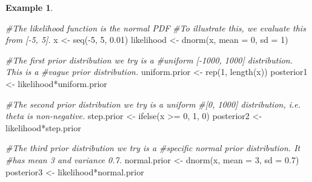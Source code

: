 \documentclass[
]{book}
\newenvironment{Shaded}{\begin{snugshade}}{\end{snugshade}}
\newcommand{\AttributeTok}[1]{\textcolor[rgb]{0.77,0.63,0.00}{#1}}
\newcommand{\CommentTok}[1]{\textcolor[rgb]{0.56,0.35,0.01}{\textit{#1}}}
\newcommand{\DecValTok}[1]{\textcolor[rgb]{0.00,0.00,0.81}{#1}}
\newcommand{\FloatTok}[1]{\textcolor[rgb]{0.00,0.00,0.81}{#1}}
\newcommand{\FunctionTok}[1]{\textcolor[rgb]{0.00,0.00,0.00}{#1}}
\newcommand{\NormalTok}[1]{#1}
\newcommand{\OtherTok}[1]{\textcolor[rgb]{0.56,0.35,0.01}{#1}}
\newcommand{\SpecialCharTok}[1]{\textcolor[rgb]{0.00,0.00,0.00}{#1}}
\theoremstyle{definition}
\theoremstyle{definition}
\newtheorem{example}{Example}[chapter]
\theoremstyle{definition}
\theoremstyle{definition}
\theoremstyle{remark}
\begin{document}
\begin{example}
\begin{Shaded}
\begin{Highlighting}[]
\CommentTok{\#The likelihood function is the normal PDF}
\CommentTok{\#To illustrate this, we evaluate this from [{-}5, 5].}
\NormalTok{x }\OtherTok{\textless{}{-}} \FunctionTok{seq}\NormalTok{(}\SpecialCharTok{{-}}\DecValTok{5}\NormalTok{, }\DecValTok{5}\NormalTok{, }\FloatTok{0.01}\NormalTok{)}
\NormalTok{likelihood }\OtherTok{\textless{}{-}} \FunctionTok{dnorm}\NormalTok{(x, }\AttributeTok{mean =} \DecValTok{0}\NormalTok{, }\AttributeTok{sd =} \DecValTok{1}\NormalTok{)}

\CommentTok{\#The first prior distribution we try is a }
\CommentTok{\#uniform [{-}1000, 1000] distribution. This is a }
\CommentTok{\#vague prior distribution. }
\NormalTok{uniform.prior }\OtherTok{\textless{}{-}} \FunctionTok{rep}\NormalTok{(}\DecValTok{1}\NormalTok{, }\FunctionTok{length}\NormalTok{(x))}
\NormalTok{posterior1 }\OtherTok{\textless{}{-}}\NormalTok{ likelihood}\SpecialCharTok{*}\NormalTok{uniform.prior}


\CommentTok{\#The second prior distribution we try is a uniform }
\CommentTok{\#[0, 1000] distribution, i.e. theta is non{-}negative. }
\NormalTok{step.prior }\OtherTok{\textless{}{-}} \FunctionTok{ifelse}\NormalTok{(x }\SpecialCharTok{\textgreater{}=} \DecValTok{0}\NormalTok{, }\DecValTok{1}\NormalTok{, }\DecValTok{0}\NormalTok{)}
\NormalTok{posterior2 }\OtherTok{\textless{}{-}}\NormalTok{ likelihood}\SpecialCharTok{*}\NormalTok{step.prior}


\CommentTok{\#The third prior distribution we try is a}
\CommentTok{\#specific normal prior distribution. It}
\CommentTok{\#has mean 3 and variance 0.7.}
\NormalTok{normal.prior }\OtherTok{\textless{}{-}} \FunctionTok{dnorm}\NormalTok{(x, }\AttributeTok{mean =} \DecValTok{3}\NormalTok{, }\AttributeTok{sd =} \FloatTok{0.7}\NormalTok{)}
\NormalTok{posterior3 }\OtherTok{\textless{}{-}}\NormalTok{ likelihood}\SpecialCharTok{*}\NormalTok{normal.prior}


\end{Highlighting}
\end{Shaded}
\end{example}
\end{document}
